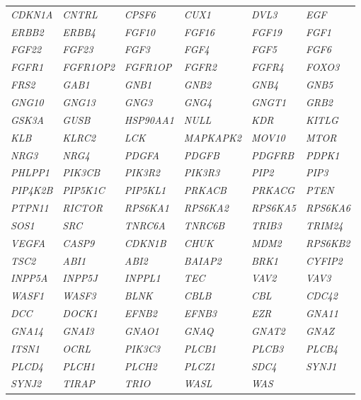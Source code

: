 \begin{longtable}{>{\em}l>{\em}l>{\em}l>{\em}l>{\em}l>{\em}l}
  \rowcolor{black!10}
  CDKN1A & CNTRL & CPSF6 & CUX1 & DVL3 & EGF \\ 
  \rowcolor{black!5}
  ERBB2 & ERBB4 & FGF10 & FGF16 & FGF19 & FGF1 \\ 
  \rowcolor{black!10}
  FGF22 & FGF23 & FGF3 & FGF4 & FGF5 & FGF6 \\ 
  \rowcolor{black!5}
  FGFR1 & FGFR1OP2 & FGFR1OP & FGFR2 & FGFR4 & FOXO3 \\ 
  \rowcolor{black!10}
  FRS2 & GAB1 & GNB1 & GNB2 & GNB4 & GNB5 \\ 
  \rowcolor{black!5}
  GNG10 & GNG13 & GNG3 & GNG4 & GNGT1 & GRB2 \\ 
  \rowcolor{black!10}
  GSK3A & GUSB & HSP90AA1 & NULL & KDR & KITLG \\ 
  \rowcolor{black!5}
  KLB & KLRC2 & LCK & MAPKAPK2 & MOV10 & MTOR \\ 
  \rowcolor{black!10}
  NRG3 & NRG4 & PDGFA & PDGFB & PDGFRB & PDPK1 \\ 
  \rowcolor{black!5}
  PHLPP1 & PIK3CB & PIK3R2 & PIK3R3 & PIP2 & PIP3 \\ 
  \rowcolor{black!10}
  PIP4K2B & PIP5K1C & PIP5KL1 & PRKACB & PRKACG & PTEN \\ 
  \rowcolor{black!5}
  PTPN11 & RICTOR & RPS6KA1 & RPS6KA2 & RPS6KA5 & RPS6KA6 \\ 
  \rowcolor{black!10}
  SOS1 & SRC & TNRC6A & TNRC6B & TRIB3 & TRIM24 \\ 
  \rowcolor{black!5}
  VEGFA & CASP9 & CDKN1B & CHUK & MDM2 & RPS6KB2 \\ 
  \rowcolor{black!10}
  TSC2 & ABI1 & ABI2 & BAIAP2 & BRK1 & CYFIP2 \\ 
  \rowcolor{black!5}
  INPP5A & INPP5J & INPPL1 & TEC & VAV2 & VAV3 \\ 
  \rowcolor{black!10}
  WASF1 & WASF3 & BLNK & CBLB & CBL & CDC42 \\ 
  \rowcolor{black!5}
  DCC & DOCK1 & EFNB2 & EFNB3 & EZR & GNA11 \\ 
  \rowcolor{black!10}
  GNA14 & GNAI3 & GNAO1 & GNAQ & GNAT2 & GNAZ \\ 
  \rowcolor{black!5}
  ITSN1 & OCRL & PIK3C3 & PLCB1 & PLCB3 & PLCB4 \\ 
  \rowcolor{black!10}
  PLCD4 & PLCH1 & PLCH2 & PLCZ1 & SDC4 & SYNJ1  \\ 
  \rowcolor{black!10}
  SYNJ2 & TIRAP & TRIO & WASL & WAS & \\ 
   \hline
\end{longtable}


